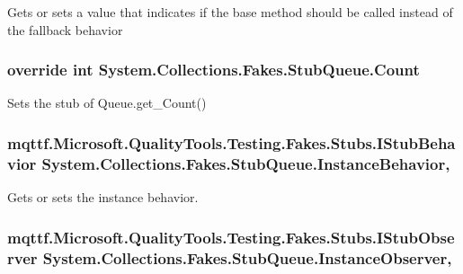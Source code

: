 Gets or sets a value that indicates if the base method should be called instead of the fallback behavior

\hypertarget{class_system_1_1_collections_1_1_fakes_1_1_stub_queue_a956dfe53ab338c748c0e58170f743e9e}{
\subsubsection[{Count}]{\setlength{\rightskip}{0pt plus 5cm}override int System.\-Collections.\-Fakes.\-Stub\-Queue.\-Count\hspace{0.3cm}{\ttfamily [get]}}}\label{class_system_1_1_collections_1_1_fakes_1_1_stub_queue_a956dfe53ab338c748c0e58170f743e9e}


Sets the stub of Queue.\-get\-\_\-\-Count()

\hypertarget{class_system_1_1_collections_1_1_fakes_1_1_stub_queue_abba63514c66cdd3d45f96174719b8e81}{
\subsubsection[{Instance\-Behavior}]{\setlength{\rightskip}{0pt plus 5cm}mqttf.\-Microsoft.\-Quality\-Tools.\-Testing.\-Fakes.\-Stubs.\-I\-Stub\-Behavior System.\-Collections.\-Fakes.\-Stub\-Queue.\-Instance\-Behavior\hspace{0.3cm}{\ttfamily [get]}, {\ttfamily [set]}}}\label{class_system_1_1_collections_1_1_fakes_1_1_stub_queue_abba63514c66cdd3d45f96174719b8e81}


Gets or sets the instance behavior.

\hypertarget{class_system_1_1_collections_1_1_fakes_1_1_stub_queue_a47397af678d8d1cd28b03b683ba7d22a}{
\subsubsection[{Instance\-Observer}]{\setlength{\rightskip}{0pt plus 5cm}mqttf.\-Microsoft.\-Quality\-Tools.\-Testing.\-Fakes.\-Stubs.\-I\-Stub\-Observer System.\-Collections.\-Fakes.\-Stub\-Queue.\-Instance\-Observer\hspace{0.3cm}{\ttfamily [get]}, {\ttfamily [set]}}}\label{class_system_1_1_collections_1_1_fakes_1_1_stub_queue_a47397af678d8d1cd28b03b683ba7d22a}


